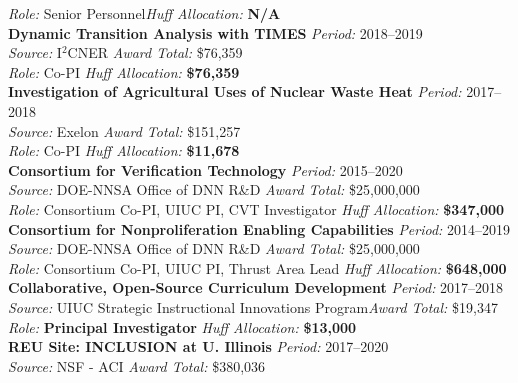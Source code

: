 \documentclass[margin,line]{resume}
\begin{document}
\begin{resume}
    \textsl{Role:} Senior Personnel\hfill \textsl{Huff Allocation:} \textbf{N/A}\vspace{2mm}\\%
    \textbf{Dynamic Transition Analysis with TIMES} \hfill \textsl{Period:}
    2018--2019\\
    \textsl{Source:} I$^2$CNER \hfill \textsl{Award Total:} \$76,359\\
    \textsl{Role:} Co-PI \hfill \textsl{Huff Allocation:} \textbf{\$76,359}\vspace{2mm}\\%
    \textbf{Investigation of Agricultural Uses of Nuclear Waste Heat} \hfill \textsl{Period:} 2017--2018\\
    \textsl{Source:} Exelon \hfill \textsl{Award Total:} \$151,257\\
    \textsl{Role:} Co-PI \hfill \textsl{Huff Allocation:} \textbf{\$11,678}\vspace{2mm}\\%
    \textbf{Consortium for Verification Technology} \hfill \textsl{Period:} 2015--2020\\
    \textsl{Source:} DOE-NNSA Office of DNN R\&D \hfill \textsl{Award Total:} \$25,000,000\\
    \textsl{Role:} Consortium Co-PI, UIUC PI, CVT Investigator  \hfill \textsl{Huff Allocation:} \textbf{\$347,000}\vspace{2mm}\\%
    \textbf{Consortium for Nonproliferation Enabling Capabilities} \hfill \textsl{Period:} 2014--2019\\
    \textsl{Source:} DOE-NNSA Office of DNN R\&D \hfill \textsl{Award Total:} \$25,000,000\\
    \textsl{Role:} Consortium Co-PI, UIUC PI, Thrust Area Lead  \hfill \textsl{Huff Allocation:} \textbf{\$648,000}\vspace{2mm}\\%
    \textbf{Collaborative, Open-Source Curriculum Development} \hfill \textsl{Period:} 2017--2018\\
    \textsl{Source:} UIUC Strategic Instructional Innovations Program\hfill \textsl{Award Total:} \$19,347\\
    \textsl{Role:} \textbf{Principal Investigator}  \hfill \textsl{Huff Allocation:} \textbf{\$13,000}\vspace{2mm}\\%
    \textbf{REU Site: INCLUSION at U. Illinois} \hfill \textsl{Period:}
    2017--2020\\
    \textsl{Source:} NSF - ACI \hfill \textsl{Award Total:} \$380,036\\

\end{resume}
\end{document}
